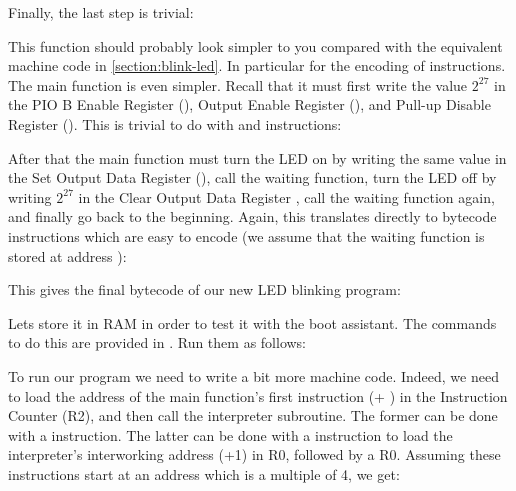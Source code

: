 Finally, the last step is trivial:


This function should probably look simpler to you compared with the equivalent
machine code in \cref{section:blink-led}. In particular for the encoding of
instructions. The main function is even simpler. Recall that it must first
write the value $2^{27}$ in the PIO B Enable Register (),
Output Enable Register (), and Pull-up Disable Register
(). This is trivial to do with  and 
instructions:


\noindent After that the main function must turn the LED on by writing the same
value in the Set Output Data Register (), call the waiting
function, turn the LED off by writing $2^{27}$ in the Clear Output Data
Register , call the waiting function again, and finally go
back to the beginning. Again, this translates directly to bytecode instructions
which are easy to encode (we assume that the waiting function is stored at
address ):


This gives the final bytecode of our new LED blinking program:



Lets store it in RAM in order to test it with the boot assistant. The commands
to do this are provided in . Run them
as follows:


To run our program we need to write a bit more machine code. Indeed, we need to
load the address of the main function's first instruction
(+ ) in the Instruction
Counter (R2), and then call the interpreter subroutine. The former can be done
with a  instruction. The latter can be done with a 
instruction to load the interpreter's interworking address
(+1) in R0, followed by a  R0. Assuming these
instructions start at an address which is a multiple of 4, we get:

